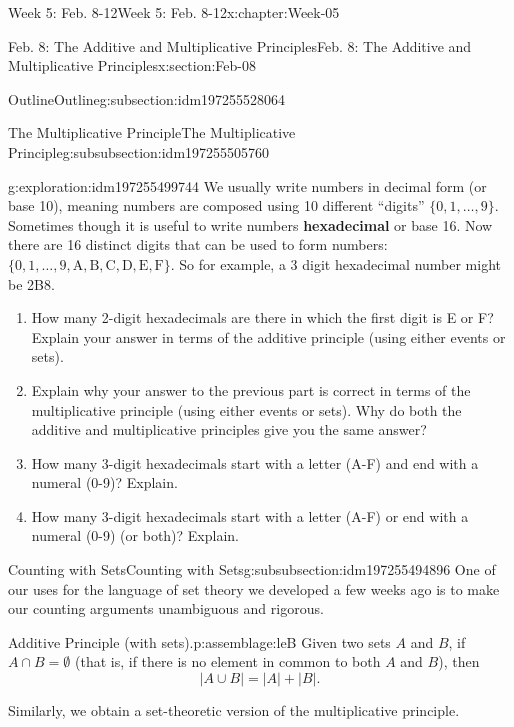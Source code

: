 \documentclass[oneside,10pt,]{book}
\newcommand{\terminology}[1]{\textbf{#1}}
\numberwithin{equation}{section}
\newcommand{\card}[1]{\left| #1 \right|}
\begin{document}
\begin{chapterptx}{Week 5: Feb. 8-12}{}{Week 5: Feb. 8-12}{}{}{x:chapter:Week-05}
\begin{sectionptx}{Feb. 8: The Additive and Multiplicative Principles}{}{Feb. 8: The Additive and Multiplicative Principles}{}{}{x:section:Feb-08}
\begin{subsectionptx}{Outline}{}{Outline}{}{}{g:subsection:idm197255528064}
\begin{subsubsectionptx}{The Multiplicative Principle}{}{The Multiplicative Principle}{}{}{g:subsubsection:idm197255505760}
\begin{exploration}{}{g:exploration:idm197255499744}%
We usually write numbers in decimal form (or base 10), meaning numbers are composed using 10 different ``digits'' \(\{0,1,\ldots, 9\}\). Sometimes though it is useful to write numbers \terminology{hexadecimal} or base 16. Now there are 16 distinct digits that can be used to form numbers: \(\{0, 1, \ldots, 9, \mathrm{A, B, C, D, E, F}\}\). So for example, a 3 digit hexadecimal number might be 2B8.%
\begin{enumerate}
\item{}How many 2-digit hexadecimals are there in which the first digit is E or F? Explain your answer in terms of the additive principle (using either events or sets).%
\par
%
\item{}Explain why your answer to the previous part is correct in terms of the multiplicative principle (using either events or sets). Why do both the additive and multiplicative principles give you the same answer?%
\item{}How many 3-digit hexadecimals start with a letter (A-F) and end with a numeral (0-9)? Explain.%
\par
%
\item{}How many 3-digit hexadecimals start with a letter (A-F) or end with a numeral (0-9) (or both)? Explain.%
\par
%
\end{enumerate}
%
\end{exploration}%
\end{subsubsectionptx}
%
%
\typeout{************************************************}
\typeout{************************************************}
%
\begin{subsubsectionptx}{Counting with Sets}{}{Counting with Sets}{}{}{g:subsubsection:idm197255494896}
One of our uses for the language of set theory we developed a few weeks ago is to make our counting arguments unambiguous and rigorous.%
\begin{assemblage}{Additive Principle (with sets).}{p:assemblage:leB}%
Given two sets \(A\) and \(B\), if \(A \cap B = \emptyset\) (that is, if there is no element in common to both \(A\) and \(B\)), then%
\begin{equation*}
\card{A \cup B} = \card{A} + \card{B}\text{.}
\end{equation*}
%
\end{assemblage}
Similarly, we obtain a set-theoretic version of the multiplicative principle.%

\end{subsubsectionptx}
\end{subsectionptx}
\end{sectionptx}
\end{chapterptx}
\end{document}
